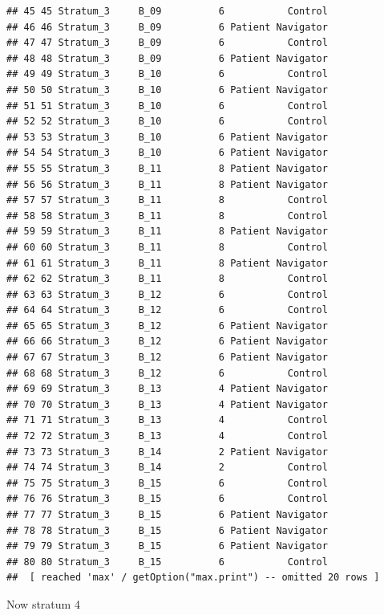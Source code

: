 \documentclass[
]{book}
\newenvironment{Shaded}{\begin{snugshade}}{\end{snugshade}}
\newcommand{\DataTypeTok}[1]{\textcolor[rgb]{0.13,0.29,0.53}{#1}}
\newcommand{\DecValTok}[1]{\textcolor[rgb]{0.00,0.00,0.81}{#1}}
\newcommand{\KeywordTok}[1]{\textcolor[rgb]{0.13,0.29,0.53}{\textbf{#1}}}
\newcommand{\NormalTok}[1]{#1}
\newcommand{\OperatorTok}[1]{\textcolor[rgb]{0.81,0.36,0.00}{\textbf{#1}}}
\newcommand{\StringTok}[1]{\textcolor[rgb]{0.31,0.60,0.02}{#1}}
\begin{document}
\begin{verbatim}
## 45 45 Stratum_3     B_09          6           Control
## 46 46 Stratum_3     B_09          6 Patient Navigator
## 47 47 Stratum_3     B_09          6           Control
## 48 48 Stratum_3     B_09          6 Patient Navigator
## 49 49 Stratum_3     B_10          6           Control
## 50 50 Stratum_3     B_10          6 Patient Navigator
## 51 51 Stratum_3     B_10          6           Control
## 52 52 Stratum_3     B_10          6           Control
## 53 53 Stratum_3     B_10          6 Patient Navigator
## 54 54 Stratum_3     B_10          6 Patient Navigator
## 55 55 Stratum_3     B_11          8 Patient Navigator
## 56 56 Stratum_3     B_11          8 Patient Navigator
## 57 57 Stratum_3     B_11          8           Control
## 58 58 Stratum_3     B_11          8           Control
## 59 59 Stratum_3     B_11          8 Patient Navigator
## 60 60 Stratum_3     B_11          8           Control
## 61 61 Stratum_3     B_11          8 Patient Navigator
## 62 62 Stratum_3     B_11          8           Control
## 63 63 Stratum_3     B_12          6           Control
## 64 64 Stratum_3     B_12          6           Control
## 65 65 Stratum_3     B_12          6 Patient Navigator
## 66 66 Stratum_3     B_12          6 Patient Navigator
## 67 67 Stratum_3     B_12          6 Patient Navigator
## 68 68 Stratum_3     B_12          6           Control
## 69 69 Stratum_3     B_13          4 Patient Navigator
## 70 70 Stratum_3     B_13          4 Patient Navigator
## 71 71 Stratum_3     B_13          4           Control
## 72 72 Stratum_3     B_13          4           Control
## 73 73 Stratum_3     B_14          2 Patient Navigator
## 74 74 Stratum_3     B_14          2           Control
## 75 75 Stratum_3     B_15          6           Control
## 76 76 Stratum_3     B_15          6           Control
## 77 77 Stratum_3     B_15          6 Patient Navigator
## 78 78 Stratum_3     B_15          6 Patient Navigator
## 79 79 Stratum_3     B_15          6 Patient Navigator
## 80 80 Stratum_3     B_15          6           Control
##  [ reached 'max' / getOption("max.print") -- omitted 20 rows ]
\end{verbatim}

Now stratum 4

\begin{Shaded}
\end{Shaded}
\end{document}
